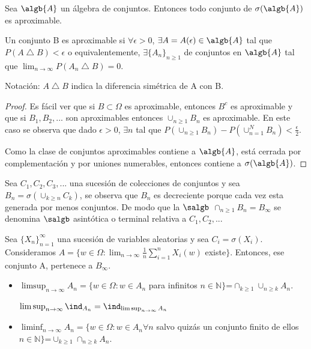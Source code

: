 \documentclass{apuntes}
\begin{document}
\begin{theorem}
Sea $\algb{A}$ un álgebra de conjuntos. Entonces todo conjunto de $\sigma(\algb{A})$ es aproximable.
\end{theorem}

\begin{defn}
Un conjunto B es aproximable si $\forall \epsilon >0$, $\exists A=A(\epsilon) \in \algb{A}$ tal que $P(A \bigtriangleup B) < \epsilon$ o equivalentemente, $\exists \{A_n\}_{n\geq 1}$ de conjuntos en $\algb{A}$ tal que $\lim_{n \rightarrow \infty}P(A_n \bigtriangleup B)=0$.

Notación: $A \bigtriangleup B$ indica la diferencia simétrica de A con B.
\end{defn}

\begin{proof}
Es fácil ver que si $B \subset \Omega$ es aproximable, entonces $B^c$ es aproximable y que si $B_1,B_2,...$ son aproximables entonces $\cup_{n\geq1} B_n$ es aproximable. En este caso se observa que dado $\epsilon >0$, $\exists n$ tal que $P(\cup_{n\geq1}B_n)-P(\cup_{n=1}^NB_n)<\frac{\epsilon}{2}$.

Como la clase de conjuntos aproximables contiene a $\algb{A}$, está cerrada por complementación y por uniones numerables, entonces contiene a $\sigma(\algb{A})$. 
\end{proof}

\begin{defn}[[$\sigma$-álgebra asintótica]
Sea $C_1, C_2, C_3,...$ una sucesión de colecciones de conjuntos y sea $B_n=\sigma(\cup_{k\geq n}C_k)$, se observa que $B_n$ es decreciente porque cada vez esta generada por menos conjuntos. De modo que la $\salgb$  $\cap_{n\geq 1}B_n=B_{\infty}$ se denomina $\salgb$ asintótica o terminal relativa a $C_1, C_2,...$
\end{defn}

\begin{example}
Sea $\{X_n\}_{n=1}^{\infty}$ una sucesión de variables aleatorias y sea $C_i=\sigma(X_i)$. Consideramos $A= \{w \in \Omega:\lim_{n \rightarrow \infty} \frac{1}{n}\sum_{i=1}^{n} X_i(w)$ existe$\}$. Entonces, ese conjunto A, pertenece a $B_{\infty}$.
\end{example}

\begin{defn}
\begin{itemize}
\item $\limsup_{n \rightarrow \infty}A_n= \{w \in \Omega: w \in A_n$ para infinitos $n \in \mathbb{N} \}$=$\cap_{k \geq 1}\cup_{n\geq k} A_n$.

\obs $\limsup_{n \rightarrow \infty} \ind_{A_n}=\ind_{\limsup_{n \rightarrow \infty} A_n}$

\item $\liminf_{n \rightarrow \infty}A_n= \{w \in \Omega: w \in A_n \forall n$ salvo quizás un conjunto finito de ellos $n \in \mathbb{N} \}$=$\cup_{k \geq 1}\cap_{n\geq k} A_n$.
\end{itemize}
\end{defn}
\end{document}
